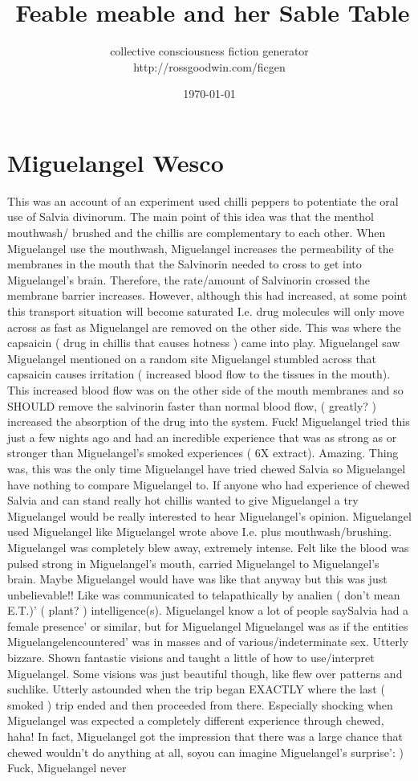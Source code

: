 \documentclass[12pt]{book}
\title{Feable meable and her Sable Table}
\author{collective consciousness fiction generator\\http://rossgoodwin.com/ficgen}
\date{\today}
\begin{document}
\maketitle



\chapter{Miguelangel Wesco}

This was an account of an experiment used chilli peppers to potentiate the oral use of Salvia divinorum. The main point of this idea was that the menthol mouthwash/ brushed and the chillis are complementary to each other. When Miguelangel use the mouthwash, Miguelangel increases the permeability of the membranes in the mouth that the Salvinorin needed to cross to get into Miguelangel's brain. Therefore, the rate/amount of Salvinorin crossed the membrane barrier increases. However, although this had increased, at some point this transport situation will become saturated I.e. drug molecules will only move across as fast as Miguelangel are removed on the other side. This was where the capsaicin ( drug in chillis that causes hotness ) came into play. Miguelangel saw Miguelangel mentioned on a random site Miguelangel stumbled across that capsaicin causes irritation ( increased blood flow to the tissues in the mouth). This increased blood flow was on the other side of the mouth membranes and so SHOULD remove the salvinorin faster than normal blood flow, ( greatly? ) increased the absorption of the drug into the system. Fuck! Miguelangel tried this just a few nights ago and had an incredible experience that was as strong as or stronger than Miguelangel's smoked experiences ( 6X extract). Amazing. Thing was, this was the only time Miguelangel have tried chewed Salvia so Miguelangel have nothing to compare Miguelangel to. If anyone who had experience of chewed Salvia and can stand really hot chillis wanted to give Miguelangel a try Miguelangel would be really interested to hear Miguelangel's opinion. Miguelangel used Miguelangel like Miguelangel wrote above I.e. plus mouthwash/brushing. Miguelangel was completely blew away, extremely intense. Felt like the blood was pulsed strong in Miguelangel's mouth, carried Miguelangel to Miguelangel's brain. Maybe Miguelangel would have was like that anyway but this was just unbelievable!! Like was communicated to telapathically by analien ( don't mean E.T.)' ( plant? ) intelligence(s). Miguelangel know a lot of people saySalvia had a female presence' or similar, but for Miguelangel Miguelangel was as if the entities Miguelangelencountered' was in masses and of various/indeterminate sex. Utterly bizzare. Shown fantastic visions and taught a little of how to use/interpret Miguelangel. Some visions was just beautiful though, like flew over patterns and suchlike. Utterly astounded when the trip began EXACTLY where the last ( smoked ) trip ended and then proceeded from there. Especially shocking when Miguelangel was expected a completely different experience through chewed, haha! In fact, Miguelangel got the impression that there was a large chance that chewed wouldn't do anything at all, soyou can imagine Miguelangel's surprise': ) Fuck, Miguelangel never 
\end{document}
